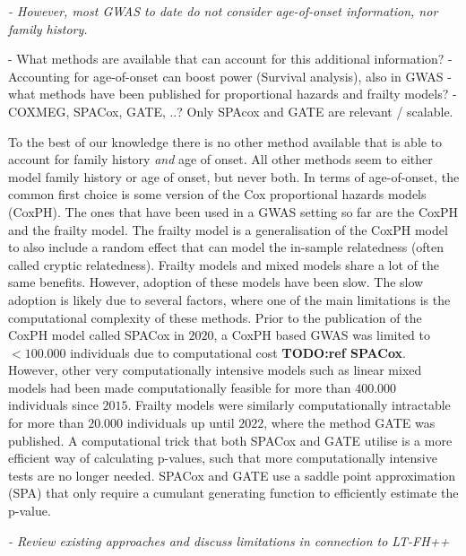 {\itshape
- However, most GWAS to date do not consider age-of-onset information, nor family history.

	- What methods are available that can account for this additional information?
	- Accounting for age-of-onset can boost power (Survival analysis), also in GWAS 
	- what methods have been published for proportional hazards and frailty models?
	- COXMEG, SPACox, GATE, ..? Only SPAcox and GATE are relevant / scalable.
}

To the best of our knowledge there is no other method available that is able to account for family history \textit{and} age of onset. All other methods seem to either model family history or age of onset, but never both. In terms of age-of-onset, the common first choice is some version of the Cox proportional hazards models (CoxPH). The ones that have been used in a GWAS setting so far are the CoxPH and the frailty model. The frailty model is a generalisation of the CoxPH model to also include a random effect that can model the in-sample relatedness (often called cryptic relatedness). Frailty models and mixed models share a lot of the same benefits. However, adoption of these models have been slow. The slow adoption is likely due to several factors, where one of the main limitations is the computational complexity of these methods. Prior to the publication of the CoxPH model called SPACox in $ 2020 $, a CoxPH based GWAS was limited to $ <100.000 $ individuals due to computational cost \textbf{TODO:ref SPACox}. However, other very computationally intensive models such as linear mixed models had been made computationally feasible for more than $ 400.000 $ individuals since $ 2015 $. Frailty models were similarly computationally intractable for more than $ 20.000 $ individuals up until $ 2022 $, where the method GATE was published. A computational trick that both SPACox and GATE utilise is a more efficient way of calculating p-values, such that more computationally intensive tests are no longer needed. SPACox and GATE use a saddle point approximation (SPA) that only require a cumulant generating function to efficiently estimate the p-value.


{\itshape
- Review existing approaches and discuss limitations in connection to LT-FH++
}

